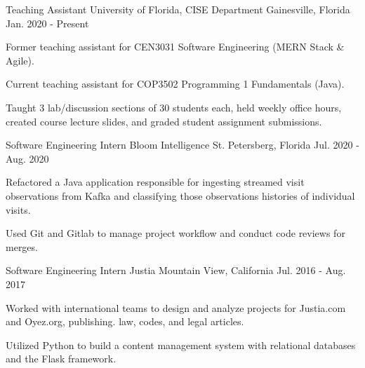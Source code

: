 

\begin{cventries}

  \cventry
    {Teaching Assistant} %
    {University of Florida, CISE Department} %
    {Gainesville, Florida} %
    {Jan. 2020 - Present} %
    {
      \begin{cvitems} %
        \item {Former teaching assistant for CEN3031 Software Engineering (MERN Stack \& Agile).}
        \item {Current teaching assistant for COP3502 Programming 1 Fundamentals (Java).}
        \item {Taught 3 lab/discussion sections of 30 students each, held weekly office hours, created course lecture slides, and graded student assignment submissions.}
      \end{cvitems}
    }

  \cventry
    {Software Engineering Intern} %
    {Bloom Intelligence} %
    {St. Petersberg, Florida} %
    {Jul. 2020 - Aug. 2020} %
    {
      \begin{cvitems} %
        \item {Refactored a Java application responsible for ingesting streamed visit observations from Kafka and classifying those observations  histories of individual visits.}
        \item {Used Git and Gitlab to manage project workflow and conduct code reviews for merges.}
      \end{cvitems}
    }

  \cventry
    {Software Engineering Intern} %
    {Justia} %
    {Mountain View, California} %
    {Jul. 2016 - Aug. 2017} %
    {
      \begin{cvitems} %
        \item {Worked with international teams to design and analyze projects for Justia.com and Oyez.org, publishing. law, codes, and legal articles.}
        \item {Utilized Python to build a content management system with relational databases and the Flask framework.}
      \end{cvitems}
    }



\end{cventries}
